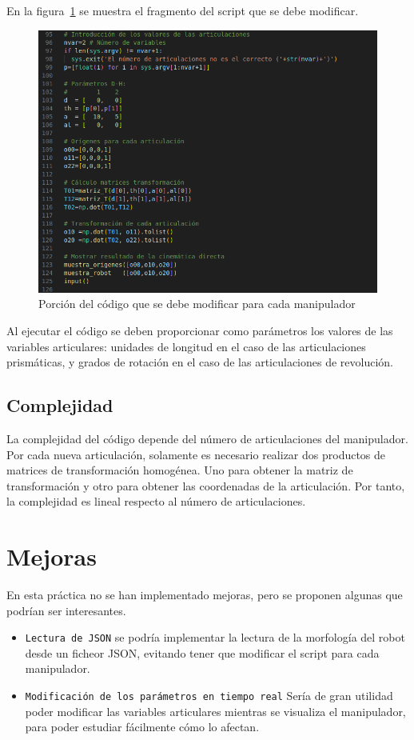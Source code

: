 En la figura~\ref{chapter:intro2} se muestra el fragmento del script que se debe modificar.
\begin{figure}[htb]
   \centering
   \includegraphics[width=1\linewidth]{images/cin_dir_1.png}
   \caption{Porción del código que se debe modificar para cada manipulador}
   \label{chapter:intro2}
\end{figure}

\bigskip Al ejecutar el código se deben proporcionar como parámetros los valores de las variables articulares: unidades de longitud en el caso de las articulaciones prismáticas, y grados de rotación en el caso de las articulaciones de revolución. 

\subsection{Complejidad}
La complejidad del código depende del número de articulaciones del manipulador. Por cada nueva articulación, solamente es necesario realizar dos productos de matrices de transformación homogénea. Uno para obtener la matriz de transformación y otro para obtener las coordenadas de la articulación. Por tanto, la complejidad es lineal respecto al número de articulaciones.
\section{Mejoras}
En esta práctica no se han implementado mejoras, pero se proponen algunas que podrían ser interesantes.
\begin{itemize}
   \item \texttt{Lectura de JSON} se podría implementar la lectura de la morfología del robot desde un ficheor JSON, evitando tener que modificar el script para cada manipulador.
   \item \texttt{Modificación de los parámetros en tiempo real} Sería de gran utilidad poder modificar las variables articulares mientras se visualiza el manipulador, para poder estudiar fácilmente cómo lo afectan.
\end{itemize}

